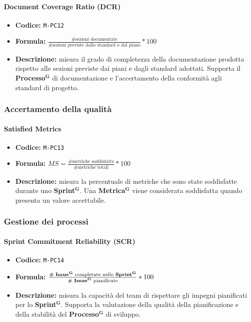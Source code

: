 \documentclass[a4paper,12pt]{article}
\newcommand{\term}[1]{\textbf{#1}$^\mathbf{G}$}
\newcommand{\ignoreglossary}{}
\begin{document}
\paragraph{Document Coverage Ratio (DCR)}
\begin{itemize}
    \item \textbf{Codice:} \texttt{M-PC12}
    \item \textbf{Formula:} $\frac{\text{\# sezioni documentate}}{\text{\# sezioni previste dallo standard o dal piano}} * 100$
    \item \textbf{Descrizione:} misura il grado di completezza della documentazione prodotta rispetto alle sezioni previste dai piani e dagli standard adottati. 
    Supporta il \term{Processo} di documentazione e l’accertamento della conformità agli standard di progetto.
\end{itemize}

\subsubsection{Accertamento della qualità}
\paragraph{Satisfied Metrics}
\begin{itemize}
    \item \textbf{Codice:} \texttt{M-PC13}
    \item \textbf{Formula:} $MS=\frac{\text{\# metriche soddisfatte}}{\text{\# metriche totali}}*100$
    \item \textbf{Descrizione:} misura la percentuale di metriche che sono state soddisfatte durante uno \term{Sprint}. Una \term{Metrica} viene considerata soddisfatta quando presenta un valore accettabile.
\end{itemize}

\subsubsection{Gestione dei processi}
\paragraph{\ignoreglossary{Sprint} Commitment Reliability (SCR)}
\begin{itemize}
    \item \textbf{Codice:} \texttt{M-PC14}
    \item \textbf{Formula:} $\frac{\text{\# \term{Issue} completate nello \term{Sprint}}}{\text{\# \term{Issue} pianificate}} * 100$
    \item \textbf{Descrizione:} misura la capacità del team di rispettare gli impegni pianificati per lo \term{Sprint}.
    Supporta la valutazione della qualità della pianificazione e della stabilità del \term{Processo} di sviluppo.
\end{itemize}
\end{document}
